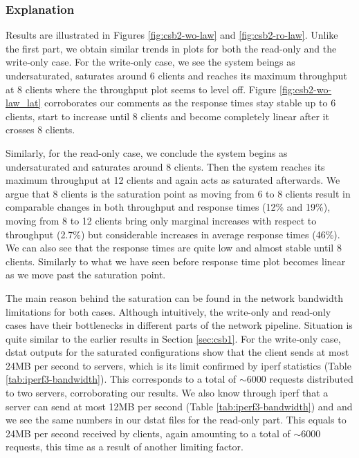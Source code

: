 \documentclass[11pt,a4paper]{article}
\begin{document}
\subsubsection{Explanation} \label{sec:csb2-exp}
Results are illustrated in Figures \ref{fig:csb2-wo-law} and \ref{fig:csb2-ro-law}. Unlike the first part, we obtain similar trends in plots for both the read-only and the write-only case.
For the write-only case, we see the system beings as undersaturated, saturates around 6 clients and reaches its maximum throughput at 8 clients where the throughput plot seems to level off. Figure \ref{fig:csb2-wo-law_lat} corroborates our comments as the response times stay stable up to 6 clients, start to increase until 8 clients and become completely linear after it crosses 8 clients.
\par Similarly, for the read-only case, we conclude the system begins as undersaturated and saturates around 8 clients. Then the system reaches its maximum throughput at 12 clients and again acts as saturated afterwards. We argue that 8 clients is the saturation point as moving from 6 to 8 clients result in comparable changes in both throughput and response times (12\% and 19\%), moving from 8 to 12 clients bring only marginal increases with respect to throughput (2.7\%) but considerable increases in average response times (46\%). We can also see that the response times are quite low and almost stable until 8 clients. Similarly to what we have seen before response time plot becomes linear as we move past the saturation point.
\par The main reason behind the saturation can be found in the network bandwidth limitations for both cases. Although intuitively, the write-only and read-only cases have their bottlenecks in different parts of the network pipeline. Situation is quite similar to the earlier results in Section \ref{sec:csb1}. For the write-only case, dstat outputs for the saturated configurations show that the client sends at most 24MB per second to servers, which is its limit confirmed by iperf statistics (Table \ref{tab:iperf3-bandwidth}). This corresponds to a total of $\sim 6000$ requests distributed to two servers, corroborating our results. We also know through iperf that a server can send at most 12MB per second (Table \ref{tab:iperf3-bandwidth}) and and we see the same numbers in our dstat files for the read-only part. This equals to 24MB per second received by clients, again amounting to a total of $\sim 6000$ requests, this time as a result of another limiting factor.
\end{document}

